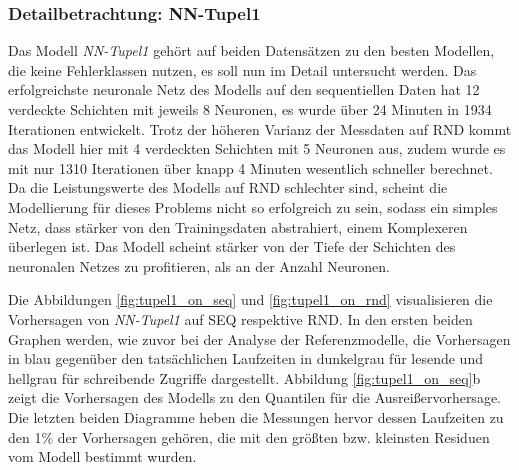 \documentclass[
	12pt,
	a4paper,
	BCOR10mm,
	DIV14,
	listof=totoc,
	bibliography=totoc,
	headsepline
]{scrreprt}
\begin{document}
\subsubsection{Detailbetrachtung: NN-Tupel1}
Das Modell \textit{NN-Tupel1} gehört auf beiden Datensätzen zu den besten Modellen, die keine Fehlerklassen nutzen, es soll nun im Detail untersucht werden.
Das erfolgreichste neuronale Netz des Modells auf den sequentiellen Daten hat 12 verdeckte Schichten mit jeweils 8 Neuronen, es wurde über 24 Minuten in 1934 Iterationen entwickelt.
Trotz der höheren Varianz der Messdaten auf RND kommt das Modell hier mit 4 verdeckten Schichten mit 5 Neuronen aus, zudem wurde es mit nur 1310 Iterationen über knapp 4 Minuten wesentlich schneller berechnet.
Da die Leistungswerte des Modells auf RND schlechter sind, scheint die Modellierung für dieses Problems nicht so erfolgreich zu sein, sodass ein simples Netz, dass stärker von den Trainingsdaten abstrahiert, einem Komplexeren überlegen ist.
Das Modell scheint stärker von der Tiefe der Schichten des neuronalen Netzes zu profitieren, als an der Anzahl Neuronen.\medskip

Die Abbildungen \ref{fig:tupel1_on_seq} und \ref{fig:tupel1_on_rnd} visualisieren die Vorhersagen von \textit{NN-Tupel1} auf SEQ respektive RND.
In den ersten beiden Graphen werden, wie zuvor bei der Analyse der Referenzmodelle, die Vorhersagen in blau gegenüber den tatsächlichen Laufzeiten in dunkelgrau für lesende und hellgrau für schreibende Zugriffe dargestellt.
Abbildung \ref{fig:tupel1_on_seq}b zeigt die Vorhersagen des Modells zu den Quantilen für die Ausreißervorhersage.
Die letzten beiden Diagramme heben die Messungen hervor dessen Laufzeiten zu den 1\% der Vorhersagen gehören, die mit den größten bzw. kleinsten Residuen vom Modell bestimmt wurden.\medskip
\end{document}

